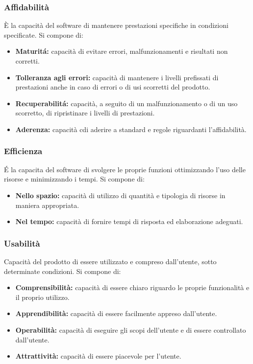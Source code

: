 \subsubsection{Affidabilit\`a}
\`E la capacit\`a del software di mantenere prestazioni specifiche in condizioni specificate.
Si compone di:
\begin{itemize}
    \item \textbf{Maturit\'a: }capacit\`a di evitare errori, malfunzionamenti e risultati non corretti.
    \item \textbf{Tolleranza agli errori: }capacit\`a di mantenere i livelli prefissati di prestazioni anche in caso di errori o di usi scorretti del prodotto.
    \item \textbf{Recuperabilit\'a: }capacit\`a, a seguito di un malfunzionamento o di un uso scorretto, di ripristinare i livelli di prestazioni.
    \item \textbf{Aderenza: }capacit\`a cdi aderire a standard e regole riguardanti l'affidabilit\`a.
\end{itemize}
\subsubsection{Efficienza}
\'E la capacita del software di svolgere le proprie funzioni ottimizzando l'uso delle risorse e minimizzando i tempi. Si compone di:
\begin{itemize}
    \item  \textbf{Nello spazio: }capacit\`a di utilizzo di quantit\`a e tipologia di risorse in maniera appropriata.
    \item  \textbf{Nel tempo: }capacit\`a di fornire tempi di risposta ed elaborazione adeguati.
\end{itemize}
\subsubsection{Usabilit\`a}
Capacit\`a del prodotto di essere utilizzato e compreso dall'utente, sotto determinate condizioni. Si compone di:
\begin{itemize}
    \item \textbf{Comprensibilit\`a: }capacit\`a di essere chiaro riguardo le proprie funzionalit\`a e il proprio utilizzo.
    \item \textbf{Apprendibilit\`a: }capacit\`a di essere facilmente appreso dall'utente.
    \item \textbf{Operabilit\`a: }capacit\`a di eseguire gli scopi dell'utente e di essere controllato dall'utente.
    \item \textbf{Attrattivit\`a: }capacit\`a di essere piacevole per l'utente.
\end{itemize}
